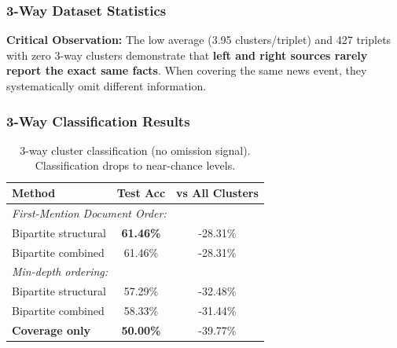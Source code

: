 \documentclass[11pt]{article}
\begin{document}
\subsubsection{3-Way Dataset Statistics}

\begin{table}[t]
\centering
{}
\caption{3-way clustering statistics. Left and right sources share remarkably few facts.}
\label{tab:3way-stats}
\end{table}

\textbf{Critical Observation:} The low average (3.95 clusters/triplet) and 427 triplets with zero 3-way clusters demonstrate that \textbf{left and right sources rarely report the exact same facts}. When covering the same news event, they systematically omit different information.

\subsubsection{3-Way Classification Results}

\begin{table}[h]
\centering
\begin{tabular}{lcc}
\toprule
\textbf{Method} & \textbf{Test Acc} & \textbf{vs All Clusters} \\
\midrule
\multicolumn{3}{l}{\textit{First-Mention Document Order:}} \\
Bipartite structural & \textbf{61.46\%} & -28.31\% \\
Bipartite combined & 61.46\% & -28.31\% \\
\midrule
\multicolumn{3}{l}{\textit{Min-depth ordering:}} \\
Bipartite structural & 57.29\% & -32.48\% \\
Bipartite combined & 58.33\% & -31.44\% \\
\midrule
\textbf{Coverage only} & \textbf{50.00\%} & -39.77\% \\
\bottomrule
\end{tabular}
\caption{3-way cluster classification (no omission signal). Classification drops to near-chance levels.}
\label{tab:3way-results}
\end{table}
\end{document}
